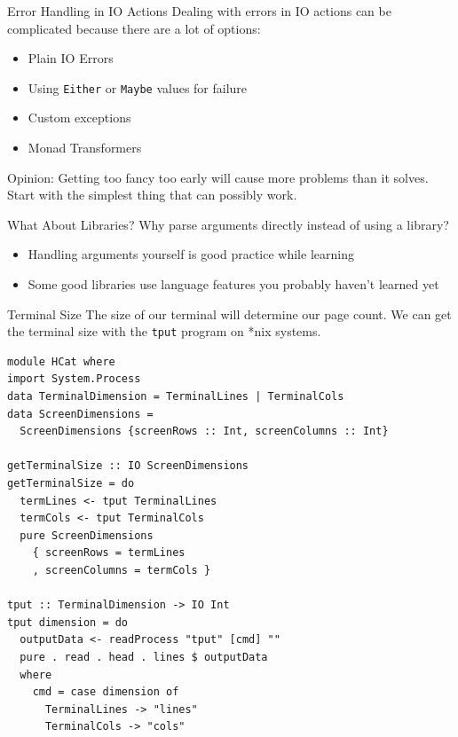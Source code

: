 \documentclass[10pt, presentation, colorlinks]{beamer}
\begin{document}
\begin{frame}[label={sec:org4d7927f},fragile]{Error Handling in IO Actions}
 Dealing with errors in IO actions can be complicated because there are a lot of options:

\bigskip
\pause

\begin{itemize}
\item Plain IO Errors
\item Using \texttt{Either} or \texttt{Maybe} values for failure
\item Custom exceptions
\item Monad Transformers
\end{itemize}

\bigskip
\pause

\alert{Opinion}: Getting too fancy too early will cause more problems than it solves. Start with the simplest thing that can possibly work.
\end{frame}

\begin{frame}[label={sec:orgd62dc51}]{What About Libraries?}
Why parse arguments directly instead of using a library?

\bigskip
\pause

\begin{itemize}
\item Handling arguments yourself is good practice while learning
\item Some good libraries use language features you probably haven't learned yet
\end{itemize}
\end{frame}

\begin{frame}[label={sec:orgf4f1935},fragile]{Terminal Size}
 The size of our terminal will determine our page count. We can get the terminal size with the \alert{\texttt{tput}} program on *nix systems.

\pause

\begin{verbatim}
module HCat where
import System.Process
data TerminalDimension = TerminalLines | TerminalCols
data ScreenDimensions =
  ScreenDimensions {screenRows :: Int, screenColumns :: Int}

getTerminalSize :: IO ScreenDimensions
getTerminalSize = do
  termLines <- tput TerminalLines
  termCols <- tput TerminalCols
  pure ScreenDimensions
    { screenRows = termLines
    , screenColumns = termCols }

tput :: TerminalDimension -> IO Int
tput dimension = do
  outputData <- readProcess "tput" [cmd] ""
  pure . read . head . lines $ outputData
  where
    cmd = case dimension of
      TerminalLines -> "lines"
      TerminalCols -> "cols"
\end{verbatim}
\end{frame}
\end{document}
